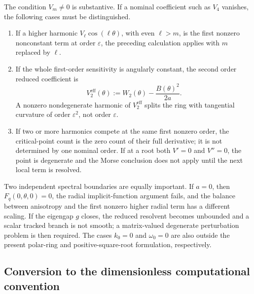 The condition \(V_m\ne0\) is substantive.  If a nominal coefficient such
as \(V_4\) vanishes, the following cases must be distinguished.
\begin{enumerate}
  \item If a higher harmonic \(V_\ell\cos(\ell\theta)\), with even
        \(\ell>m\), is the first nonzero nonconstant term at order
        \(\varepsilon\), the preceding calculation applies with
        \(m\) replaced by \(\ell\).
  \item If the whole first-order sensitivity is angularly constant, the
        second order reduced coefficient is
        \begin{equation}
          V_2^{\mathrm{eff}}(\theta)
          :=W_2(\theta)-\frac{B(\theta)^2}{2a}.
          \label{eq:effective-second-order-angular-potential}
        \end{equation}
        A nonzero nondegenerate harmonic of
        \(V_2^{\mathrm{eff}}\) splits the ring with tangential curvature of
        order \(\varepsilon^2\), not order \(\varepsilon\).
  \item If two or more harmonics compete at the same first nonzero order,
        the critical-point count is the zero count of their full derivative;
        it is not determined by one nominal order.  If at a root both
        \(V'=0\) and \(V''=0\), the point is degenerate and the Morse
        conclusion does not apply until the next local term is resolved.
\end{enumerate}

Two independent spectral boundaries are equally important.  If \(a=0\),
then \(F_q(0,\theta,0)=0\), the radial implicit-function argument fails,
and the balance between anisotropy and the first nonzero higher radial term
has a different scaling.  If the eigengap \(g\) closes, the reduced
resolvent becomes unbounded and a scalar tracked branch is not smooth; a
matrix-valued degenerate perturbation problem is then required.  The cases
\(k_0=0\) and \(\omega_0=0\) are also outside the present polar-ring and
positive-square-root formulation, respectively.

\subsection{Conversion to the dimensionless computational convention}

